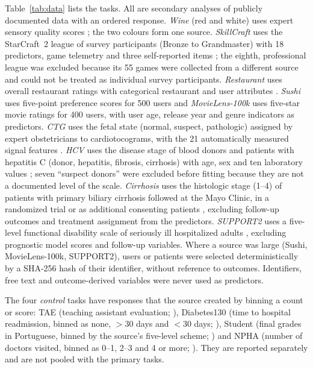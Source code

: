 \documentclass[pdflatex,sn-mathphys-ay]{sn-jnl}
\theoremstyle{thmstyleone}
\theoremstyle{thmstylethree}
\begin{document}
Table~\ref{tab:data} lists the tasks. All are secondary analyses of publicly documented data with an ordered response. \emph{Wine} (red and white) uses expert sensory quality scores \citep{Cortez2009,UCIWine}; the two colours form one source. \emph{SkillCraft} uses the StarCraft~2 league of survey participants (Bronze to Grandmaster) with 18 predictors, game telemetry and three self-reported items \citep{Thompson2013,Thompson2014,UCISkillCraft}; the eighth, professional league was excluded because its 55 games were collected from a different source and could not be treated as individual survey participants. \emph{Restaurant} uses overall restaurant ratings with categorical restaurant and user attributes \citep{UCIRestaurant}. \emph{Sushi} uses five-point preference scores \citep[2016 corrected release;][]{Kamishima2003} for 500 users and \emph{MovieLens-100k} uses five-star movie ratings \citep{Harper2015} for 400 users, with user age, release year and genre indicators as predictors. \emph{CTG} uses the fetal state (normal, suspect, pathologic) assigned by expert obstetricians to cardiotocograms, with the 21 automatically measured signal features \citep{AyresDeCampos2000,UCICTG}. \emph{HCV} uses the disease stage of blood donors and patients with hepatitis C (donor, hepatitis, fibrosis, cirrhosis) with age, sex and ten laboratory values \citep{Hoffmann2018,UCIHCV}; seven ``suspect donors'' were excluded before fitting because they are not a documented level of the scale. \emph{Cirrhosis} uses the histologic stage (1--4) of patients with primary biliary cirrhosis followed at the Mayo Clinic, in a randomized trial or as additional consenting patients \citep{Dickson1989,UCICirrhosis}, excluding follow-up outcomes and treatment assignment from the predictors. \emph{SUPPORT2} uses a five-level functional disability scale of seriously ill hospitalized adults \citep{Knaus1995}, excluding prognostic model scores and follow-up variables. Where a source was large (Sushi, MovieLens-100k, SUPPORT2), users or patients were selected deterministically by a SHA-256 hash of their identifier, without reference to outcomes. Identifiers, free text and outcome-derived variables were never used as predictors.

The four \emph{control} tasks have responses that the source created by binning a count or score: TAE (teaching assistant evaluation; \citealp{UCITAE}), Diabetes130 (time to hospital readmission, binned as none, $>$30 days and $<$30 days; \citealp{Strack2014,UCIDiabetes130}), Student (final grades in Portuguese, binned by the source's five-level scheme; \citealp{UCIStudent}) and NPHA (number of doctors visited, binned as 0--1, 2--3 and 4 or more; \citealp{Malani2019}). They are reported separately and are not pooled with the primary tasks.
\end{document}
